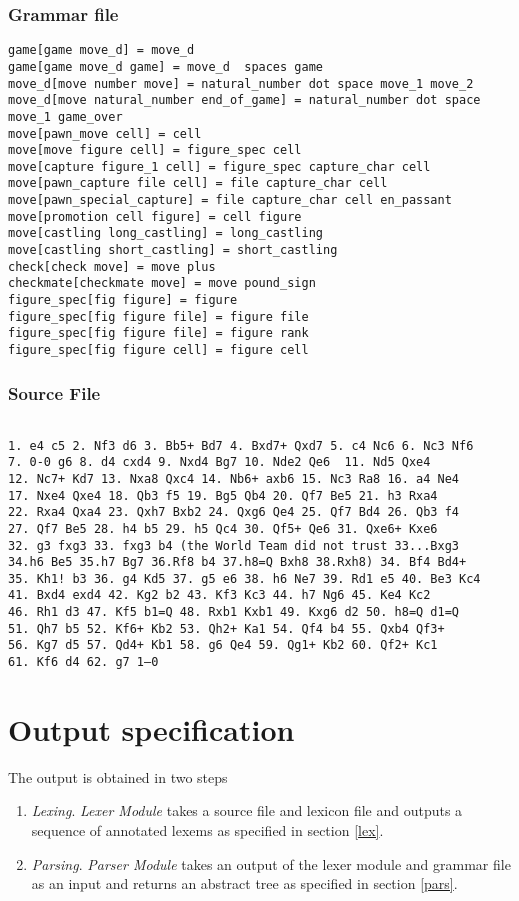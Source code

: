 \documentclass[a4paper,10pt]{article}
\begin{document}
\subsubsection{Grammar file}
\begin{verbatim}
game[game move_d] = move_d 
game[game move_d game] = move_d  spaces game
move_d[move number move] = natural_number dot space move_1 move_2
move_d[move natural_number end_of_game] = natural_number dot space move_1 game_over
move[pawn_move cell] = cell
move[move figure cell] = figure_spec cell
move[capture figure_1 cell] = figure_spec capture_char cell
move[pawn_capture file cell] = file capture_char cell
move[pawn_special_capture] = file capture_char cell en_passant
move[promotion cell figure] = cell figure
move[castling long_castling] = long_castling
move[castling short_castling] = short_castling
check[check move] = move plus
checkmate[checkmate move] = move pound_sign
figure_spec[fig figure] = figure
figure_spec[fig figure file] = figure file
figure_spec[fig figure file] = figure rank
figure_spec[fig figure cell] = figure cell
\end{verbatim}

\subsubsection{Source File}

\begin{verbatim}

1. e4 c5 2. Nf3 d6 3. Bb5+ Bd7 4. Bxd7+ Qxd7 5. c4 Nc6 6. Nc3 Nf6 
7. 0-0 g6 8. d4 cxd4 9. Nxd4 Bg7 10. Nde2 Qe6  11. Nd5 Qxe4 
12. Nc7+ Kd7 13. Nxa8 Qxc4 14. Nb6+ axb6 15. Nc3 Ra8 16. a4 Ne4 
17. Nxe4 Qxe4 18. Qb3 f5 19. Bg5 Qb4 20. Qf7 Be5 21. h3 Rxa4 
22. Rxa4 Qxa4 23. Qxh7 Bxb2 24. Qxg6 Qe4 25. Qf7 Bd4 26. Qb3 f4 
27. Qf7 Be5 28. h4 b5 29. h5 Qc4 30. Qf5+ Qe6 31. Qxe6+ Kxe6 
32. g3 fxg3 33. fxg3 b4 (the World Team did not trust 33...Bxg3 
34.h6 Be5 35.h7 Bg7 36.Rf8 b4 37.h8=Q Bxh8 38.Rxh8) 34. Bf4 Bd4+ 
35. Kh1! b3 36. g4 Kd5 37. g5 e6 38. h6 Ne7 39. Rd1 e5 40. Be3 Kc4 
41. Bxd4 exd4 42. Kg2 b2 43. Kf3 Kc3 44. h7 Ng6 45. Ke4 Kc2 
46. Rh1 d3 47. Kf5 b1=Q 48. Rxb1 Kxb1 49. Kxg6 d2 50. h8=Q d1=Q 
51. Qh7 b5 52. Kf6+ Kb2 53. Qh2+ Ka1 54. Qf4 b4 55. Qxb4 Qf3+ 
56. Kg7 d5 57. Qd4+ Kb1 58. g6 Qe4 59. Qg1+ Kb2 60. Qf2+ Kc1 
61. Kf6 d4 62. g7 1–0 
\end{verbatim}

\section{Output specification}
The output is obtained in two steps
\begin{enumerate}
\item \textit{Lexing}.  \textit{Lexer Module} takes a source file and lexicon file and outputs a sequence of annotated lexems as specified in section \ref{lex}.
\item \textit{Parsing}. \textit{Parser Module} takes an output of the lexer module and grammar file as an input and returns an abstract tree as specified in section \ref{pars}.
\end{enumerate}
\end{document}
